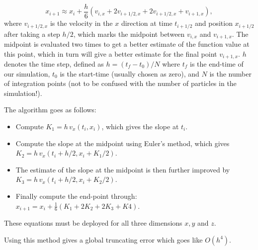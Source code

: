\documentclass{article}
\begin{document}
\begin{multicols}{2}
\begin{equation}
	x_{i+1} \approx x_i + \frac{h}{6} (v_{i,x} + 2 v_{i + 1/2,x} + 2 v_{i + 1/2,x} + v_{i+1,x}),
\end{equation}
where $v_{i + 1/2,x} $ is the velocity in the $x$ direction at time $t_{i + 1/2}$ and position $x_{i + 1/2}$ after taking a step $h/2$, which marks the midpoint between $v_{i,x}$ and $v_{i+1,x}$. The midpoint is evaluated two times to get a better estimate of the function value at this point, which in turn will give a better estimate for the final point $v_{i+1,x}$. $h$ denotes the time step, defined as $h = (t_f - t_0)/N$ where $t_f$ is the end-time of our simulation, $t_0$ is the start-time (usually chosen as zero), and $N$ is the number of integration points (not to be confused with the number of particles in the simulation!).

The algorithm goes as follows:

\begin{itemize}
	\item Compute $K_1 = h \, v_x(t_i,x_i)$, which gives the slope at $t_i$.
	\item Compute the slope at the midpoint using Euler's method, which gives $K_2 = h \, v_x(t_i + h/2, x_i + K_1/2)$.
	\item The estimate of the slope at the midpoint is then further improved by $K_3 = h \, v_x(t_i + h/2, x_i + K_2/2)$.
	\item Finally compute the end-point through: \\ $x_{i+1} = x_i + \frac{1}{6}(K_1 + 2K_2 + 2K_3 + K4)$.
\end{itemize}
These equations must be deployed for all three dimensions $x,y$ and $z$.

Using this method gives a global truncating error which goes like $O(h^4)$. 



\end{multicols}
\end{document}
